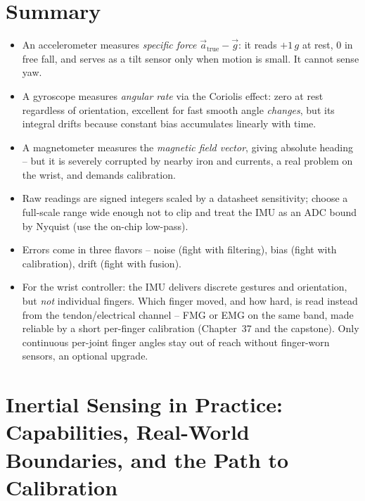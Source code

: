 \section{Summary}
\label{ch34:summary}

\begin{itemize}
\item An accelerometer measures \emph{specific force} $\vec a_{\text{true}}-\vec g$:
  it reads $+1\,g$ at rest, $0$ in free fall, and serves as a tilt sensor only when
  motion is small. It cannot sense yaw.
\item A gyroscope measures \emph{angular rate} via the Coriolis effect: zero at rest
  regardless of orientation, excellent for fast smooth angle \emph{changes}, but its
  integral drifts because constant bias accumulates linearly with time.
\item A magnetometer measures the \emph{magnetic field vector}, giving absolute heading
  -- but it is severely corrupted by nearby iron and currents, a real problem on the
  wrist, and demands calibration.
\item Raw readings are signed integers scaled by a datasheet sensitivity; choose a
  full-scale range wide enough not to clip and treat the IMU as an ADC bound by Nyquist
  (use the on-chip low-pass).
\item Errors come in three flavors -- noise (fight with filtering), bias (fight with
  calibration), drift (fight with fusion).
\item For the wrist controller: the IMU delivers discrete gestures and orientation, but
  \emph{not} individual fingers. Which finger moved, and how hard, is read instead from
  the tendon/electrical channel -- FMG or EMG on the same band, made reliable by a short
  per-finger calibration (Chapter~37 and the capstone). Only continuous per-joint finger
  angles stay out of reach without finger-worn sensors, an optional upgrade.
\end{itemize}

\section{Inertial Sensing in Practice: Capabilities, Real-World Boundaries, and the Path to Calibration}
\label{ch34:capabilities-limits}

